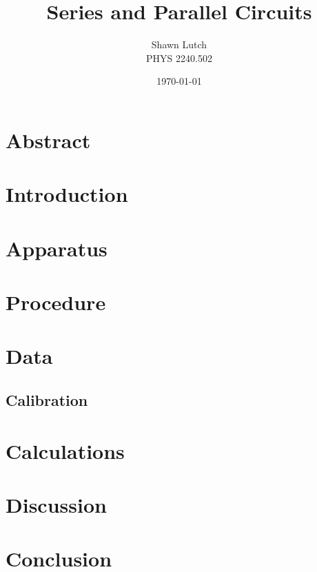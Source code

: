 \documentclass[12pt,letterpaper,titlepage]{report}
\newcommand{\myTitle}{Series and Parallel Circuits}
\newcommand{\myName}{Shawn Lutch}
\newcommand{\myPeriod}{PHYS 2240.502}
\begin{document}


\title{\myTitle{}}
\author{\myName{}\\ \myPeriod{}}
\date{\today}
\maketitle




\section*{Abstract}




\section*{Introduction}




\section*{Apparatus}




\section*{Procedure}




\section*{Data}


\subsection*{Calibration}

\begin{minipage}{\linewidth}
\centering
{} \label{tab:title}

\end{minipage}

\bigskip

\begin{minipage}{\linewidth}
\centering
{} \label{tab:title}

\end{minipage}




\section*{Calculations}




\section*{Discussion}




\section*{Conclusion}


\end{document}
